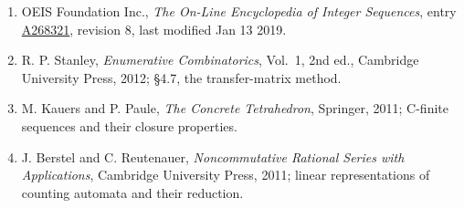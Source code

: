\documentclass[11pt]{article}
\theoremstyle{definition}
\begin{document}
\begin{enumerate}

\item OEIS Foundation Inc., \emph{The On-Line Encyclopedia of Integer Sequences}, entry \href{https://oeis.org/A268321}{A268321}, revision 8, last modified Jan 13 2019.

\item R. P. Stanley, \emph{Enumerative Combinatorics}, Vol.~1, 2nd ed., Cambridge University Press, 2012; \S4.7, the transfer-matrix method.

\item M. Kauers and P. Paule, \emph{The Concrete Tetrahedron}, Springer, 2011; C-finite sequences and their closure properties.

\item J. Berstel and C. Reutenauer, \emph{Noncommutative Rational Series with Applications}, Cambridge University Press, 2011; linear representations of counting automata and their reduction.

\end{enumerate}
\end{document}
